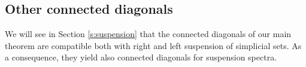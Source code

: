 




\subsection{Other connected diagonals}
We will see in Section \ref{s:suspension} that the connected diagonals of our main theorem are compatible both with right and left suspension of simplicial sets. As a consequence, they yield also connected diagonals for suspension spectra.

